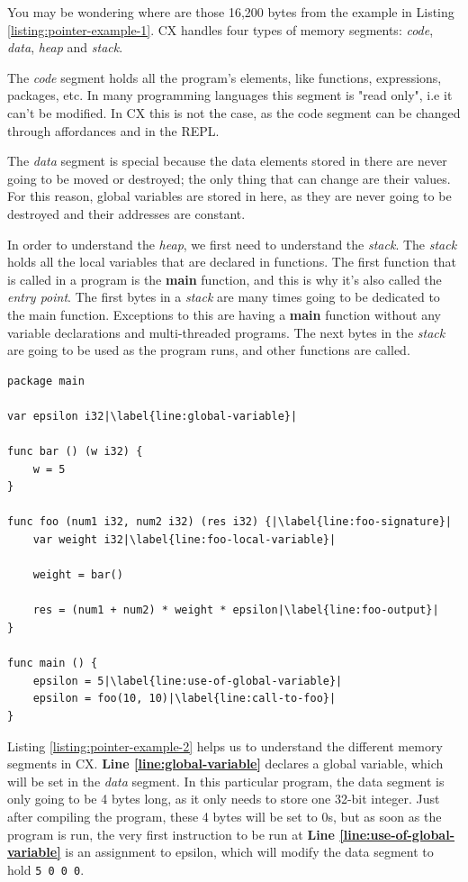 \documentclass[11pt,fleqn,openany]{book} %
\begin{document}
You may be wondering where are those 16,200 bytes from the example in Listing \ref{listing:pointer-example-1}. CX handles four types of memory segments: \emph{code}, \emph{data}, \emph{heap} and \emph{stack}.

The \emph{code} segment holds all the program's elements, like functions, expressions, packages, etc. In many programming languages this segment is "read only", i.e it can't be modified. In CX this is not the case, as the code segment can be changed through affordances and in the REPL.

The \emph{data} segment is special because the data elements stored in there are never going to be moved or destroyed; the only thing that can change are their values. For this reason, global variables are stored in here, as they are never going to be destroyed and their addresses are constant.

In order to understand the \emph{heap}, we first need to understand the \emph{stack}. The \emph{stack} holds all the local variables that are declared in functions. The first function that is called in a program is the \textbf{main} function, and this is why it's also called the \emph{entry point}. The first bytes in a \emph{stack} are many times going to be dedicated to the main function. Exceptions to this are having a \textbf{main} function without any variable declarations and multi-threaded programs. The next bytes in the \emph{stack} are going to be used as the program runs, and other functions are called.

\begin{lstlisting}[caption={Pointer to a Structu},captionpos=b,label={listing:pointer-example-2}]
package main

var epsilon i32|\label{line:global-variable}|

func bar () (w i32) {
	w = 5
}

func foo (num1 i32, num2 i32) (res i32) {|\label{line:foo-signature}|
	var weight i32|\label{line:foo-local-variable}|

	weight = bar()

	res = (num1 + num2) * weight * epsilon|\label{line:foo-output}|
}

func main () {
	epsilon = 5|\label{line:use-of-global-variable}|
	epsilon = foo(10, 10)|\label{line:call-to-foo}|
}

\end{lstlisting}

Listing \ref{listing:pointer-example-2} helps us to understand the different memory segments in CX. \textbf{Line \ref{line:global-variable}} declares a global variable, which will be set in the \emph{data} segment. In this particular program, the data segment is only going to be 4 bytes long, as it only needs to store one 32-bit integer. Just after compiling the program, these 4 bytes will be set to 0s, but as soon as the program is run, the very first instruction to be run at \textbf{Line \ref{line:use-of-global-variable}} is an assignment to epsilon, which will modify the data segment to hold \lstinline{5 0 0 0}.
\end{document}
